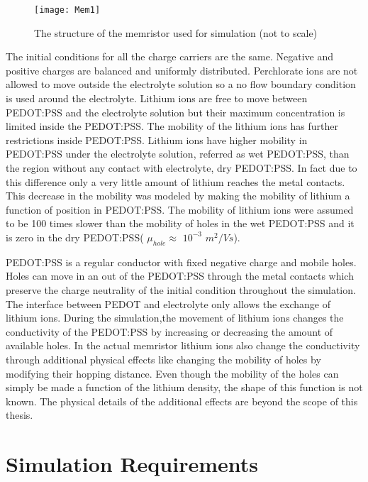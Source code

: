 \begin{doublespace}
\begin{figure}[!htp]
\centering
\texttt{[image: Mem1]}
\caption{The structure of the memristor used for simulation (not to scale)} 
\label{MemStc}
\end{figure}


The initial conditions for all the charge carriers are the same. Negative and positive charges are balanced and uniformly distributed. Perchlorate ions are not allowed to move outside the electrolyte solution so a no flow boundary condition is used around the electrolyte. Lithium ions are free to move between PEDOT:PSS and the electrolyte solution but their maximum concentration is limited inside the PEDOT:PSS. The mobility of the lithium ions has further restrictions inside PEDOT:PSS. Lithium ions have higher mobility in PEDOT:PSS under the electrolyte solution, referred as wet PEDOT:PSS, than the region without any contact with electrolyte, dry PEDOT:PSS. In fact due to this difference only a very little amount of lithium reaches the metal contacts. This decrease in the mobility was modeled by making the mobility of lithium a function of position in PEDOT:PSS. The mobility of lithium ions were assumed to be 100 times slower than the mobility of holes in the wet PEDOT:PSS and it is zero in the dry PEDOT:PSS( $\mu_{hole} \approx$ $10^{-3}$ $m^2/Vs$). 


PEDOT:PSS is a regular conductor with fixed negative charge and mobile holes. Holes can move in an out of the PEDOT:PSS through the metal contacts which preserve the charge neutrality of the initial condition throughout the simulation. The interface between PEDOT and electrolyte only allows the exchange of lithium ions. During the simulation,the movement of lithium ions changes the conductivity of the PEDOT:PSS by increasing or decreasing the amount of available holes. In the actual memristor lithium ions also change the conductivity through additional physical effects like changing the mobility of holes by modifying their hopping distance. Even though the mobility of the holes can simply be made a function of the lithium density, the shape of this function is not known. The physical details of the additional effects are beyond the scope of this thesis. 


\clearpage
\section{Simulation Requirements}


\end{doublespace}
